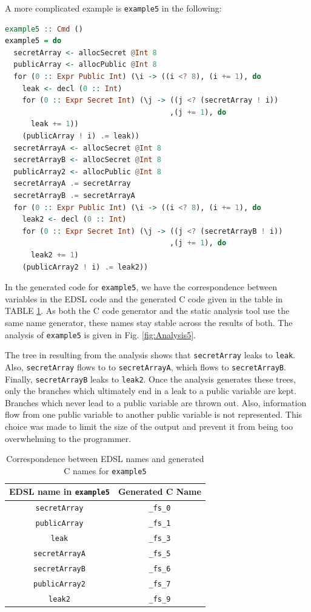 \documentclass[10pt, conference]{IEEEtran}
\newcommand{\ttt}{\texttt}
\begin{document}
A more complicated example is \ttt{example5} in the following:

\begin{lstlisting}[language=Haskell]
example5 :: Cmd ()
example5 = do
  secretArray <- allocSecret @Int 8
  publicArray <- allocPublic @Int 8
  for (0 :: Expr Public Int) (\i -> ((i <? 8), (i += 1), do
    leak <- decl (0 :: Int)
    for (0 :: Expr Secret Int) (\j -> ((j <? (secretArray ! i))
                                      ,(j += 1), do
      leak += 1))
    (publicArray ! i) .= leak))
  secretArrayA <- allocSecret @Int 8
  secretArrayB <- allocSecret @Int 8
  publicArray2 <- allocPublic @Int 8
  secretArrayA .= secretArray
  secretArrayB .= secretArrayA
  for (0 :: Expr Public Int) (\i -> ((i <? 8), (i += 1), do
    leak2 <- decl (0 :: Int)
    for (0 :: Expr Secret Int) (\j -> ((j <? (secretArrayB ! i))
                                      ,(j += 1), do
      leak2 += 1)
    (publicArray2 ! i) .= leak2))
\end{lstlisting}

In the generated code for \ttt{example5}, we have the correspondence between variables in the EDSL code and the
generated C code given in the table in TABLE \ref{table:Names5}. As both the C code generator and the
static analysis tool use the same name generator, these names stay stable across the results of both. The analysis of \ttt{example5} is given in Fig. \ref{fig:Analysis5}.

The tree in resulting from the analysis shows that \ttt{secretArray} leaks to \ttt{leak}. Also, \ttt{secretArray} flows to
to \ttt{secretArrayA}, which flows to \ttt{secretArrayB}. Finally, \ttt{secretArrayB} leaks to \ttt{leak2}. Once
the analysis generates these trees, only the branches which ultimately end in a leak to a public variable
are kept. Branches which never lead to a public variable are thrown out. Also, information flow from one
public variable to another public variable is not represented. This choice was made to limit the size
of the output and prevent it from being too overwhelming to the programmer.

\begin{table}
  \centering
  \begin{tabular}{|c|c|}
    \hline
    EDSL name in \ttt{example5} & Generated C Name \\
    \hline
    \verb|secretArray| & \verb|_fs_0|\\
    \hline
    \verb|publicArray| & \verb|_fs_1|\\
    \hline
    \verb|leak| & \verb|_fs_3|\\
    \hline
    \verb|secretArrayA| & \verb|_fs_5|\\
    \hline
    \verb|secretArrayB| & \verb|_fs_6|\\
    \hline
    \verb|publicArray2| & \verb|_fs_7|\\
    \hline
    \verb|leak2| & \verb|_fs_9|\\
    \hline
  \end{tabular}
\caption{Correspondence between EDSL names and generated C names for \ttt{example5}}
\label{table:Names5}
\end{table}
\end{document}
